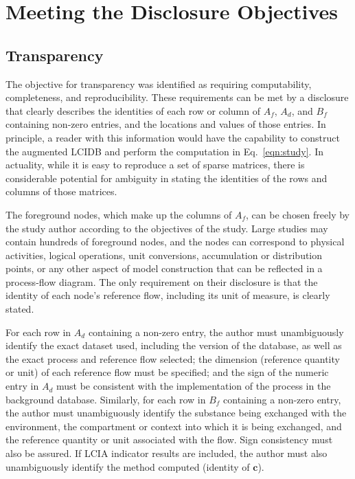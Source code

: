 


\section{Meeting the Disclosure Objectives}

\subsection{Transparency}

The objective for transparency was identified as requiring computability, completeness, and reproducibility.  These requirements can be met by a disclosure that clearly describes the identities of each row or column of $A_f$, $A_d$, and $B_f$ containing non-zero entries, and the locations and values of those entries.  In principle, a reader with this information would have the capability to construct the augmented LCIDB and perform the computation in Eq.~\ref{eqn:study}.  In actuality, while it is easy to reproduce a set of sparse matrices, there is considerable potential for ambiguity in stating the identities of the rows and columns of those matrices.

The foreground nodes, which make up the columns of $A_f$, can be chosen freely by the study author according to the objectives of the study.  Large studies may contain hundreds of foreground nodes, and the nodes can correspond to physical activities, logical operations, unit conversions, accumulation or distribution points, or any other aspect of model construction that can be reflected in a process-flow diagram.  The only requirement on their disclosure is that the identity of each node's reference flow, including its unit of measure, is clearly stated.  

For each row in $A_d$ containing a non-zero entry, the author must unambiguously identify the exact dataset used, including the version of the database, as well as the exact process and reference flow selected; the dimension (reference quantity or unit) of each reference flow must be specified; and the sign of the numeric entry in $A_d$ must be consistent with the implementation of the process in the background database.  Similarly, for each row in $B_f$ containing a non-zero entry, the author must unambiguously identify the substance being exchanged with the environment, the compartment or context into which it is being exchanged, and the reference quantity or unit associated with the flow.  Sign consistency must also be assured.  If LCIA indicator results are included, the author must also unambiguously identify the method computed (identity of $\mathbf{c}$).


